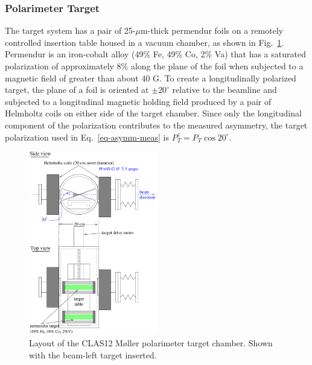 \subsubsection{Polarimeter Target}
\label{sec-PolTgt}

The target system has a pair of 25-$\mu$m-thick permendur foils on a remotely controlled insertion table housed in a vacuum 
chamber, as shown in Fig.~\ref{fig-MPtgt}. Permendur is an iron-cobalt alloy (49\% Fe, 49\% Co, 2\% Va) that has a saturated polarization
of approximately 8\% along the plane of the foil when subjected to a magnetic field of greater than about 40 G. To create a longitudinally 
polarized target, the plane of a foil is 
oriented at $\pm 20^\circ$ relative to the beamline and subjected to a longitudinal magnetic holding field produced by a pair of Helmholtz 
coils on either side of the target chamber. Since only the longitudinal component of the polarization contributes to the
measured asymmetry, the target polarization used in Eq.~\ref{eq-asymm-meas} is $P_T^z=P_T\cos 20^\circ$. 

\begin{figure}[hbtp]
 \begin{center}
  \includegraphics[width=0.5\textwidth]{MPtgt.pdf}
 \end{center}
	 \caption[]{Layout of the CLAS12 M{\o}ller polarimeter target chamber. Shown with the beam-left target inserted.}
 \label{fig-MPtgt}
\end{figure}

